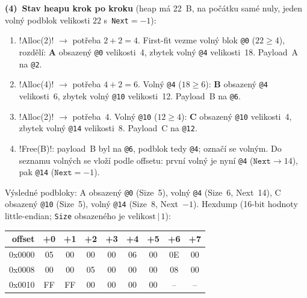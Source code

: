 \begin{priklad}
\textbf{(4)~Stav heapu krok po kroku} (heap má 22~B, na počátku samé nuly, jeden volný podblok velikosti $22$ s~\texttt{Next}$=-1$):
\begin{enumerate}
\item \cd!Alloc(2)! $\to$ potřeba $2{+}2=4$. First-fit vezme volný blok \texttt{@0} ($22\ge4$), rozdělí: \textbf{A} obsazený \texttt{@0} velikosti~4, zbytek volný \texttt{@4} velikosti~18. Payload~A na \texttt{@2}.
\item \cd!Alloc(4)! $\to$ potřeba $4{+}2=6$. Volný \texttt{@4} ($18\ge6$): \textbf{B} obsazený \texttt{@4} velikosti~6, zbytek volný \texttt{@10} velikosti~12. Payload~B na \texttt{@6}.
\item \cd!Alloc(2)! $\to$ potřeba~4. Volný \texttt{@10} ($12\ge4$): \textbf{C} obsazený \texttt{@10} velikosti~4, zbytek volný \texttt{@14} velikosti~8. Payload~C na \texttt{@12}.
\item \cd!Free(B)!: payload~B byl na \texttt{@6}, podblok tedy \texttt{@4}; označí se volným. Do seznamu volných se vloží podle offsetu: první volný je nyní \texttt{@4} ($\texttt{Next}\to14$), pak \texttt{@14} ($\texttt{Next}=-1$).
\end{enumerate}
Výsledné podbloky: A obsazený \texttt{@0} (Size~5), volný \texttt{@4} (Size~6, Next~14), C obsazený \texttt{@10} (Size~5), volný \texttt{@14} (Size~8, Next~$-1$). Hexdump (16-bit hodnoty little-endian; \texttt{Size} obsazeného je $\text{velikost}\,|\,1$):
\begin{center}\ttfamily\small
\begin{tabular}{r|cccccccc}
offset & +0 & +1 & +2 & +3 & +4 & +5 & +6 & +7\\\hline
0x0000 & 05 & 00 & 00 & 00 & 06 & 00 & 0E & 00\\
0x0008 & 00 & 00 & 05 & 00 & 00 & 00 & 08 & 00\\
0x0010 & FF & FF & 00 & 00 & 00 & 00 & -- & --\\
\end{tabular}
\end{center}


\end{priklad}
